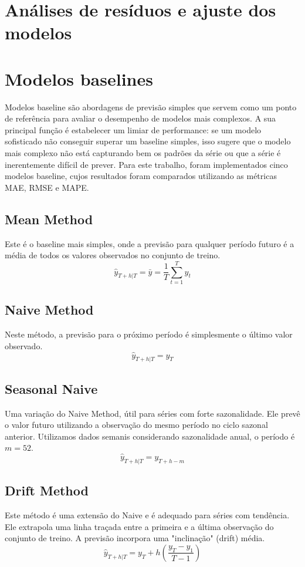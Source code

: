 \documentclass{article}
\begin{document}
\section{Análises de resíduos e ajuste dos modelos}
\section{Modelos baselines}

Modelos baseline são abordagens de previsão simples que servem como um ponto de referência para avaliar o desempenho de modelos mais complexos. A sua principal função é estabelecer um limiar de performance: se um modelo sofisticado não conseguir superar um baseline simples, isso sugere que o modelo mais complexo não está capturando bem os padrões da série ou que a série é inerentemente difícil de prever. Para este trabalho, foram implementados cinco modelos baseline, cujos resultados foram comparados utilizando as métricas MAE, RMSE e MAPE.

\subsection{Mean Method}
Este é o baseline mais simples, onde a previsão para qualquer período futuro é a média de todos os valores observados no conjunto de treino.
$$ \hat{y}_{T+h|T} = \bar{y} = \frac{1}{T}\sum_{t=1}^{T}y_t $$

\subsection{Naive Method}
Neste método, a previsão para o próximo período é simplesmente o último valor observado.
$$ \hat{y}_{T+h|T} = y_T $$

\subsection{Seasonal Naive}
Uma variação do Naive Method, útil para séries com forte sazonalidade. Ele prevê o valor futuro utilizando a observação do mesmo período no ciclo sazonal anterior. Utilizamos dados semanis considerando sazonalidade anual, o período é $m=52$.
$$ \hat{y}_{T+h|T} = y_{T+h-m} $$

\subsection{Drift Method}
Este método é uma extensão do Naive e é adequado para séries com tendência. Ele extrapola uma linha traçada entre a primeira e a última observação do conjunto de treino. A previsão incorpora uma "inclinação" (drift) média.
$$ \hat{y}_{T+h|T} = y_T + h \left( \frac{y_T - y_1}{T-1} \right) $$
\end{document}

